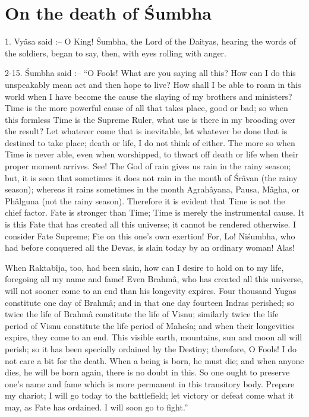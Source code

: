 ﻿\chapter{On the death of \'Sumbha}

1. Vy\^asa said :-- O King! \'Sumbha, the Lord of the Daityas, hearing the words of the soldiers, began to say, then, with eyes rolling with anger.

2-15. \'Sumbha said :-- ``O Fools! What are you saying all this? How can I do this unspeakably mean act and then hope to live? How shall I be able to roam in this world when I have become the cause the slaying of my brothers and ministers? Time is the more powerful cause of all that takes place, good or bad; so when this formless Time is the Supreme Ruler, what use is there in my brooding over the result? Let whatever come that is inevitable, let whatever be done that is destined to take place; death or life, I do not think of either. The more so when Time is never able, even when worshipped, to thwart off death or life when their proper moment arrives. See! The God of rain gives us rain in the rainy season; but, it is seen that sometimes it does not rain in the month of \'Sr\^avan (the rainy season); whereas it rains sometimes in the month Agrah\^ayana, Pausa, M\^agha, or Ph\^alguna (not the rainy season). Therefore it is evident that Time is not the chief factor. Fate is stronger than Time; Time is merely the instrumental cause. It is this Fate that has created all this universe; it cannot be rendered otherwise. I consider Fate Supreme; Fie on this one's own exertion! For, Lo! Ni\'sumbha, who had before conquered all the Devas, is slain today by an ordinary woman! Alas!

When Raktab\^ija, too, had been slain, how can I desire to hold on to my life, foregoing all my name and fame! Even Brahm\^a, who has created all this universe, will not sooner come to an end than his longevity expires. Four thousand Yugas constitute one day of Brahm\^a; and in that one day fourteen Indras perished; so twice the life of Brahm\^a constitute the life of Visnu; similarly twice the life period of Visnu constitute the life period of Mahe\'sa; and when their longevities expire, they come to an end. This visible earth, mountains, sun and moon all will perish; so it has been specially ordained by the Destiny; therefore, O Fools! I do not care a bit for the death. When a being is born, he must die; and when anyone dies, he will be born again, there is no doubt in this. So one ought to preserve one's name and fame which is more permanent in this transitory body. Prepare my chariot; I will go today to the battlefield; let victory or defeat come what it may, as Fate has ordained. I will soon go to fight.''

